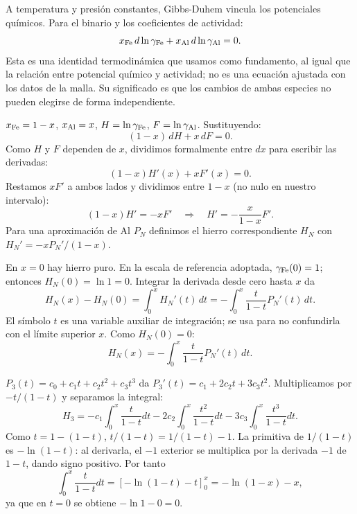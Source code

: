 A temperatura y presión constantes, Gibbs-Duhem vincula los potenciales químicos. Para el binario y los coeficientes de actividad:
\[
x_{\mathrm{Fe}}\,d\ln\gamma_{\mathrm{Fe}}+x_{\mathrm{Al}}\,d\ln\gamma_{\mathrm{Al}}=0.
\]
Esta es una identidad termodinámica que usamos como fundamento, al igual que la relación entre potencial químico y actividad; no es una ecuación ajustada con los datos de la malla. Su significado es que los cambios de ambas especies no pueden elegirse de forma independiente.

$x_{\mathrm{Fe}}=1-x$, $x_{\mathrm{Al}}=x$, $H=\ln\gamma_{\mathrm{Fe}}$, $F=\ln\gamma_{\mathrm{Al}}$. Sustituyendo:
\[
(1-x)\,dH+x\,dF=0.
\]
Como $H$ y $F$ dependen de $x$, dividimos formalmente entre $dx$ para escribir las derivadas:
\[
(1-x)H'(x)+xF'(x)=0.
\]
Restamos $xF'$ a ambos lados y dividimos entre $1-x$ (no nulo en nuestro intervalo):
\[
(1-x)H'=-xF'\quad\Rightarrow\quad H'=-\frac{x}{1-x}F'.
\]
Para una aproximación de Al $P_N$ definimos el hierro correspondiente $H_N$ con $H_N'=-xP_N'/(1-x)$.

En $x=0$ hay hierro puro. En la escala de referencia adoptada, $\gamma_{\mathrm{Fe}}(0)=1$; entonces $H_N(0)=\ln1=0$. Integrar la derivada desde cero hasta $x$ da
\[
H_N(x)-H_N(0)=\int_0^x H_N'(t)\,dt
=-\int_0^x\frac{t}{1-t}P_N'(t)\,dt.
\]
El símbolo $t$ es una variable auxiliar de integración; se usa para no confundirla con el límite superior $x$. Como $H_N(0)=0$:
\[
\boxed{H_N(x)=-\int_0^x\frac{t}{1-t}P_N'(t)\,dt.}
\]

$P_3(t)=c_0+c_1t+c_2t^2+c_3t^3$ da $P_3'(t)=c_1+2c_2t+3c_3t^2$. Multiplicamos por $-t/(1-t)$ y separamos la integral:
\[
H_3=-c_1\int_0^x\frac{t}{1-t}dt-2c_2\int_0^x\frac{t^2}{1-t}dt
-3c_3\int_0^x\frac{t^3}{1-t}dt.
\]
Como $t=1-(1-t)$, $t/(1-t)=1/(1-t)-1$. La primitiva de $1/(1-t)$ es $-\ln(1-t)$: al derivarla, el $-1$ exterior se multiplica por la derivada $-1$ de $1-t$, dando signo positivo. Por tanto
\[
\int_0^x\frac{t}{1-t}dt=[-\ln(1-t)-t]_0^x=-\ln(1-x)-x,
\]
ya que en $t=0$ se obtiene $-\ln1-0=0$.

